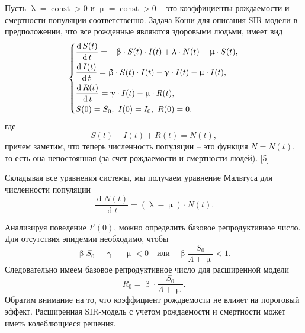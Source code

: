 \documentclass[a4paper, 14pt]{extreport}
\numberwithin{equation}{section}
\renewcommand{\beta}{\upbeta}
\renewcommand{\gamma}{\upgamma}
\renewcommand{\lambda}{\uplambda}
\renewcommand{\mu}{\upmu}
\renewcommand{\d}{\operatorname{d}}
\begin{document}
	Пусть $\lambda = \operatorname{const} > 0$ и $\mu = \operatorname{const} > 0$ -- это коэффициенты рождаемости и смертности популяции соответственно. Задача Коши для описания SIR-модели в предположении, что все рожденные являются здоровыми людьми, имеет вид 
	\begin{equation}
		\begin{dcases}
		\dfrac {\d S(t)}{\d t} = -\beta \cdot S(t) \cdot I(t) + \lambda\cdot N(t) - \mu\cdot S(t),\\
		\dfrac{\d I(t)}{\d t} = \beta \cdot S(t)\cdot I(t) - \gamma\cdot I(t) - \mu\cdot I(t),\\
		\dfrac{\d R(t)}{\d t} = \gamma\cdot I(t) - \mu \cdot R(t),\\
		S(0) = S_0, \ I(0) = I_0,\ R(0) = 0.
		\end{dcases}
	\end{equation}
	где $$S(t) + I(t) + R(t) = N(t),$$ причем заметим, что теперь численность популяции -- это функция $N = N(t)$, то есть она непостоянная (за счет рождаемости и смертности людей). [5]
	
	Складывая все уравнения системы, мы получаем уравнение Мальтуса для численности популяции 
	\begin{equation}
	\dfrac{\d N(t)}{\d t} = (\lambda-\mu) \cdot N(t).
	\end{equation}
	
	Анализируя поведение $I'(0)$, можно определить базовое репродуктивное число. Для отсутствия эпидемии необходимо, чтобы $$\beta S_0 - \gamma - \mu < 0 \quad \text{или}\quad \beta \dfrac{S_0}{\Lambda+\mu} < 1.$$
	Следовательно имеем базовое репродуктивное число для расширенной модели $$R_0 = \beta \cdot \dfrac{S_0}{\Lambda+\mu}.$$ Обратим внимание на то, что коэффициент рождаемости не влияет на пороговый
	эффект. Расширенная SIR-модель с учетом рождаемости и смертности может иметь колеблющиеся решения.
	
\end{document}
